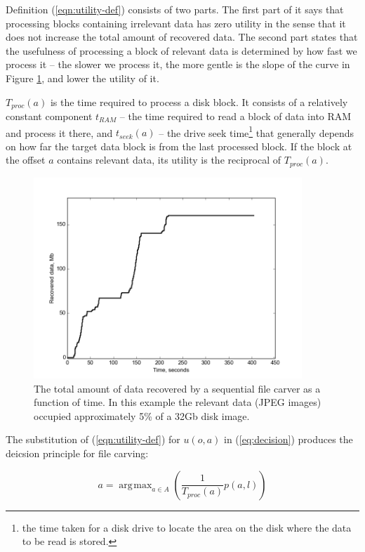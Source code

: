 \documentclass[final,5p,times,twocolumn,authoryear]{elsarticle}
\DeclareMathOperator*{\argmax}{\arg\!\max}
\begin{document}
Definition (\ref{eqn:utility-def}) consists of two parts. The first part of it says that processing blocks containing irrelevant data has zero utility in the sense that it does not increase the total amount of recovered data. The second part states that the usefulness of processing a block of relevant data is determined by how fast we process it -- the slower we process it, the more gentle is the slope of the curve in Figure \ref{fig:sequential}, and lower the utility of it. 

$T_{proc}(a)$ is the time required to process a disk block. It consists of a relatively constant component $t_{RAM}$ -- the time required to read a block of data into RAM and process it there, and $t_{seek}(a)$ -- the drive seek time\footnote{the time taken for a disk drive to locate the area on the disk where the data to be read is stored.} that generally depends on how far the target data block is from the last processed block. If the block at the offset $a$ contains relevant data, its utility is the reciprocal of $T_{proc}(a)$.

\begin{figure}
	\center
	\includegraphics[width=0.9\textwidth]{wc_fig}
	\caption{The total amount of data recovered by a sequential file carver as a function of time. In this example the relevant data (JPEG images) occupied approximately 5\% of a 32Gb disk image.}
	\label{fig:sequential}
\end{figure}

The substitution of  (\ref{eqn:utility-def}) for $u(o,a)$ in (\ref{eq:decision}) produces the deicsion principle for file carving:

\begin{equation} \label{eq:carving-decision}
a = \argmax_{a \in A} \left( \frac{1}{T_{proc}(a)} p(a,l)\right)
\end{equation}
\end{document}
